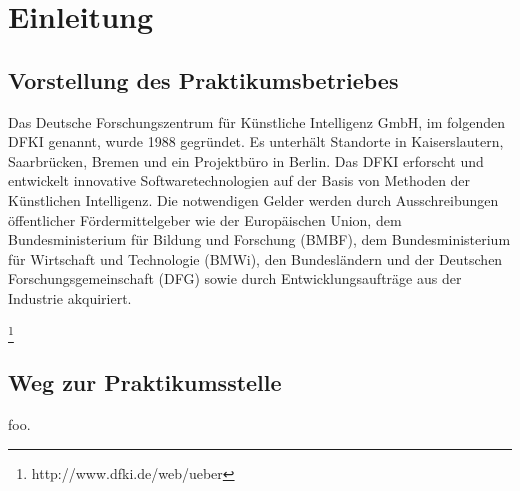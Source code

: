 \chapter{Einleitung}
\label{sec:intro}
\section{Vorstellung des Praktikumsbetriebes}
\label{sec:intro:dfki}
Das Deutsche Forschungszentrum für Künstliche Intelligenz GmbH, im folgenden DFKI genannt, wurde 1988 gegründet.
Es unterhält Standorte in Kaiserslautern, Saarbrücken, Bremen und ein Projektbüro in Berlin.
Das DFKI erforscht und entwickelt innovative Softwaretechnologien auf der Basis von Methoden der Künstlichen Intelligenz.
Die notwendigen Gelder werden durch Ausschreibungen öffentlicher Fördermittelgeber wie der Europäischen Union, dem Bundesministerium für Bildung und Forschung (BMBF), dem Bundesministerium für Wirtschaft und Technologie (BMWi), den Bundesländern und der Deutschen Forschungsgemeinschaft (DFG) sowie durch Entwicklungsaufträge aus der Industrie akquiriert.

\footnote{http://www.dfki.de/web/ueber}
\section{Weg zur Praktikumsstelle}
\label{sec:intro:motivation}
foo.